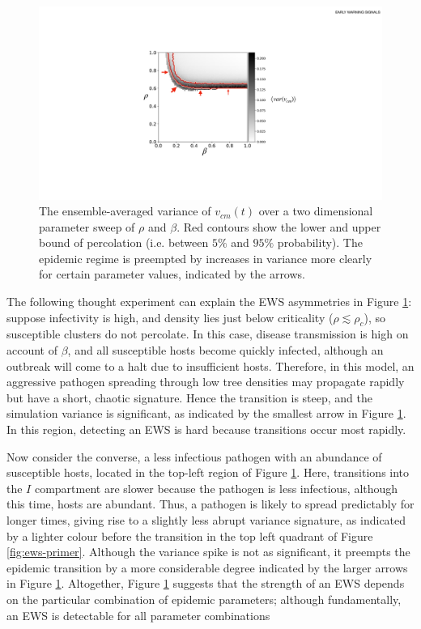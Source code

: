  \begin{figure}
    \centering
    \includegraphics[scale=0.45]{chapter3/figures/figure11.pdf}
    \caption{The ensemble-averaged variance of $v_{cm}(t)$ over a two dimensional parameter sweep of $\rho$ and $\beta$. Red contours show the lower and upper bound of percolation (i.e. between $5\%$ and $95\%$ probability). 
     The epidemic regime is preempted by increases in variance more clearly for certain parameter values, %
     indicated by the arrows.}
    \label{fig:ews-results} 
\end{figure}

The following thought experiment can explain the EWS asymmetries in Figure \ref{fig:ews-results}: %
suppose infectivity is high, and density lies just below criticality ($\rho\lesssim\rho_c$), 
so susceptible clusters do not percolate. 
In this case, disease transmission is high on account of $\beta$, 
and all susceptible hosts become quickly infected, 
although an outbreak will come to a halt due to insufficient hosts. Therefore, in this model, 
an aggressive pathogen spreading through low tree densities may propagate rapidly but have a short, 
chaotic signature. Hence the transition is steep,
and the simulation variance is significant, as indicated by the smallest arrow in Figure \ref{fig:ews-results}. 
In this region, detecting an EWS is hard because transitions occur most rapidly.

Now consider the converse, a less infectious pathogen with an abundance of susceptible hosts, 
located in the top-left region of Figure \ref{fig:ews-results}.
Here, transitions into the $I$ compartment are slower because the pathogen is less infectious, 
although this time, hosts are abundant.
Thus, a pathogen is likely to spread predictably for longer times, 
giving rise to a slightly less abrupt variance signature, 
as indicated by a lighter colour before the transition in the top left quadrant of Figure \ref{fig:ews-primer}.
Although the variance spike is not as significant, 
it preempts the epidemic transition by a more considerable degree\textemdash
indicated by the larger arrows in Figure \ref{fig:ews-results}.
Altogether, Figure \ref{fig:ews-results} suggests that the strength of an EWS depends on the particular combination of epidemic parameters; 
although fundamentally, an EWS is detectable for all parameter combinations
\newpage

